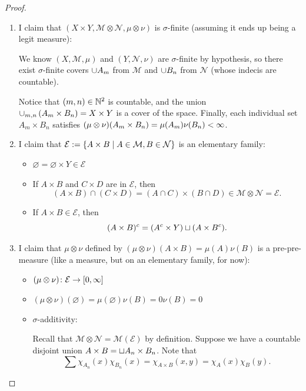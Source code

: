 \documentclass[11pt,leqno,oneside]{amsbook}
\numberwithin{thm}{section}
\newcommand{\M}{\mathcal{M}}
\newcommand{\E}{\mathcal{E}}
\newcommand{\cN}{\mathcal{N}}
\newcommand{\s}{$\sigma$-} %
\newcommand{\x}{\times}
\newcommand{\ox}{\otimes}
\renewcommand{\emptyset}{\varnothing}
\begin{document}
\begin{proof}
  \mbox{}
  \begin{enumerate}[label=(\arabic{*})]
    \item I claim that $(X \x Y, \M \ox \cN, \mu \ox \nu)$ is \s finite (assuming it ends up being a legit measure):

      We know $(X, \M, \mu)$ and $(Y, \cN, \nu)$ are \s finite by hypothesis, so there exist \s finite covers $\cup A_m$ from $\M$ and $\cup B_n$ from $\cN$ (whose indecis are countable).

      Notice that $(m, n) \in {\mathbb N}^2$ is countable, and the union $\union_{m,n}\left(A_m \x B_n\right) = X \x Y$ is a cover of the space.  Finally, each individual set $A_m \x B_n$ satisfies $(\mu\ox\nu)(A_m \x B_n) = \mu(A_m)\nu(B_n) < \oo$.

    \item I claim that $\E := \{A \x B \st A \in \M, B \in \cN\}$ is an elementary family:

      \begin{itemize}
        \item $\emptyset = \emptyset \x Y \in \E$
        \item If $A \x B$ and $C \x D$ are in $\E$, then $$(A \x B) \cap (C \x D) = (A \cap C) \x (B \cap D) \in \M \ox \cN = \E.$$
        \item If $A \x B \in \E$, then $$(A \x B)^c = (A^c \x Y) \dunion (A \x B^c).$$
      \end{itemize}

    \item I claim that $\mu \ox \nu$ defined by $(\mu\ox\nu)(A \x B) = \mu(A)\nu(B)$ is a pre-pre-measure (like a measure, but on an elementary family, for now):

      \begin{itemize}
        \item $(\mu\ox\nu)\from\E\to[0, \oo]$
        \item $(\mu\ox\nu)(\emptyset) = \mu(\emptyset)\nu(B) = 0\nu(B) = 0$
        \item \s additivity:

        Recall that $\M \ox \cN = \M(\E)$ by definition.  Suppose we have a countable disjoint union $A \x B = \dunion A_n \x B_n$.  Note that
        $$\sum \chi_{A_n}(x)\chi_{B_n}(x) = \chi_{A \x B}(x,y) = \chi_A(x)\chi_B(y).$$


\end{itemize}
\end{enumerate}
\end{proof}
\end{document}

